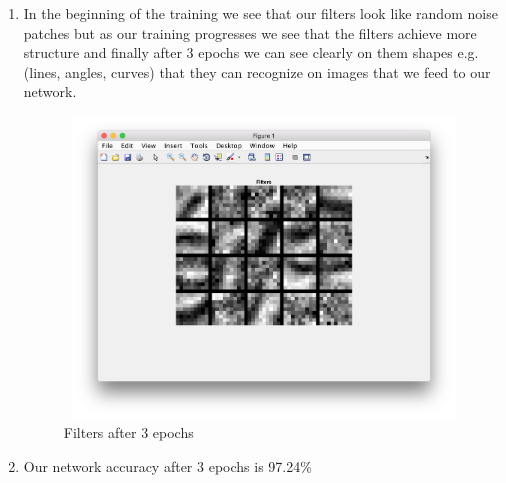 \documentclass{article}
\begin{document}
\begin{enumerate}
\item In the beginning of the training we see that our filters look like random noise patches but as our training progresses we see that the filters achieve more structure and finally after 3 epochs we can see clearly on them shapes e.g.(lines, angles, curves) that they can recognize on images that we feed to our network.
\begin{figure}[H]
    \centering
    \includegraphics[width=1\textwidth,height=8cm,keepaspectratio]{filters.png}
    \caption{Filters after 3 epochs}
    \label{fig:picture}
  \end{figure}
\item Our network accuracy after 3 epochs is 97.24\%
\end{enumerate}
\end{document}
